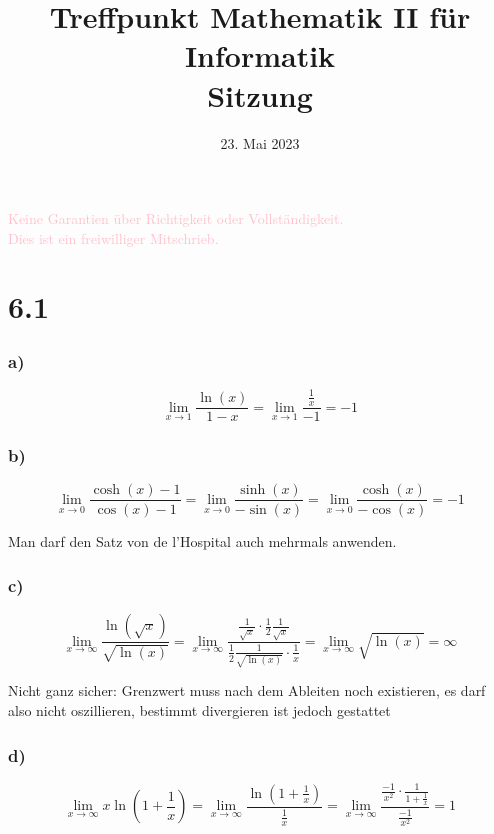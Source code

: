 \documentclass[
    accentcolor=pink,
    boxarc,
    dark_mode,
    logofile=enmpty
]{rubos-tuda-template}
\date{23. Mai 2023}
\title[trans rights <3]{Treffpunkt Mathematik II für Informatik \\ Sitzung \getSheetnumber{}}
\begin{document}
    \maketitle{}
    \begin{anmerkung}
        \huge{\textcolor{pink}{Keine Garantien über Richtigkeit oder Vollständigkeit. \\ Dies ist ein freiwilliger Mitschrieb.}}
    \end{anmerkung}
    \section*{6.1}
    \subsubsection*{a)}
    \[\lim_{x \to 1} \frac{\ln(x)}{1-x} = \lim_{x \to 1} \frac{\frac{1}{x}}{-1} = -1\]

    \subsubsection*{b)}
    \[\lim_{x \to 0} \frac{\cosh(x)-1}{\cos(x)-1} = \lim_{x \to 0} \frac{\sinh(x)}{-\sin(x)} = \lim_{x \to 0} \frac{\cosh(x)}{-\cos(x)} = -1\]
    \begin{anmerkung}
        Man darf den Satz von de l'Hospital auch mehrmals anwenden.
    \end{anmerkung}

    \subsubsection*{c)}
    \[\lim_{x \to \infty} \frac{\ln(\sqrt{x})}{\sqrt{\ln(x)}} = \lim_{x \to \infty} \frac{\frac{1}{\sqrt{x}} \cdot \frac{1}{2}\frac{1}{\sqrt{x}}}{\frac{1}{2}\frac{1}{\sqrt{\ln(x)}} \cdot \frac{1}{x}} = \lim_{x \to \infty} \sqrt{\ln(x)}= \infty\]
    \begin{anmerkung}
        Nicht ganz sicher: Grenzwert muss nach dem Ableiten noch existieren, es darf also nicht oszillieren, bestimmt divergieren ist jedoch gestattet
    \end{anmerkung}

    \subsubsection*{d)}
    \[\lim_{x \to \infty} x \ln(1 + \frac{1}{x}) = \lim_{x \to \infty} \frac{\ln(1+\frac{1}{x})}{\frac{1}{x}} = \lim_{x \to \infty} \frac{\frac{-1}{x^2} \cdot \frac{1}{1+\frac{1}{x}}}{\frac{-1}{x^2}} = 1\]
\end{document}
